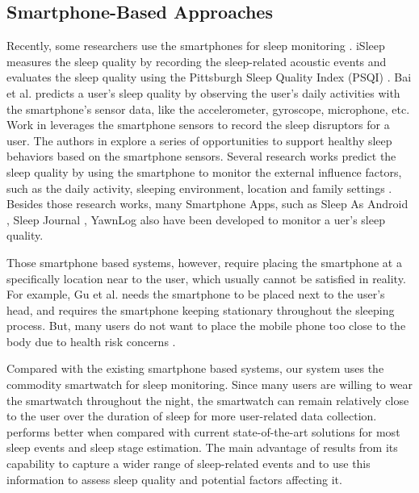 \subsection{Smartphone-Based Approaches}
Recently, some researchers use the smartphones for sleep monitoring \cite{hao2013isleep,bai2012will,kay2012lullaby,choe2011opportunities} . iSleep \cite{hao2013isleep} measures the sleep quality by recording the sleep-related acoustic events and evaluates the sleep quality using the Pittsburgh Sleep Quality Index (PSQI) \cite{carpenter1998psychometric}. Bai et al. \cite{bai2012will} predicts a user's sleep quality by observing the user's daily activities with the smartphone's sensor data, like the accelerometer, gyroscope, microphone, etc. Work in \cite{kay2012lullaby} leverages the smartphone sensors to record the sleep disruptors for a user. The authors in \cite{choe2011opportunities}  explore a series of opportunities to support healthy sleep behaviors based on the smartphone sensors. Several research works predict the sleep quality by using the smartphone to monitor the external  influence  factors, such as the daily activity, sleeping environment, location and family settings \cite{chen2013unobtrusive,zhang2013real}. Besides those research works, many Smartphone Apps, such as Sleep As Android \cite{SleepAndroid}, Sleep Journal \cite{SleepJournal}, YawnLog \cite{YawnLog} also have been developed to monitor a uer's sleep quality.

Those smartphone based systems, however, require placing the smartphone at a specifically location near to the user, which usually cannot be satisfied in reality. For example, Gu et al. \cite{gu2016sleep} needs the smartphone to be placed next to the user's head, and requires the smartphone keeping stationary throughout the sleeping process. But, many users do not want to place the mobile phone too close to the body due to health risk concerns  \cite{StepHealth,Quorasleep}.

Compared with the existing smartphone based systems, our system uses the commodity smartwatch for sleep monitoring. Since many users are willing to wear the smartwatch throughout the night, the smartwatch can remain relatively close to the user over the duration of sleep for more user-related data collection. {\systemname} performs better  when compared with current state-of-the-art solutions for most sleep events and sleep stage estimation. The main advantage of {\systemname} results from its capability to capture a wider range of sleep-related events and to use this information to assess sleep quality and potential factors affecting it.

